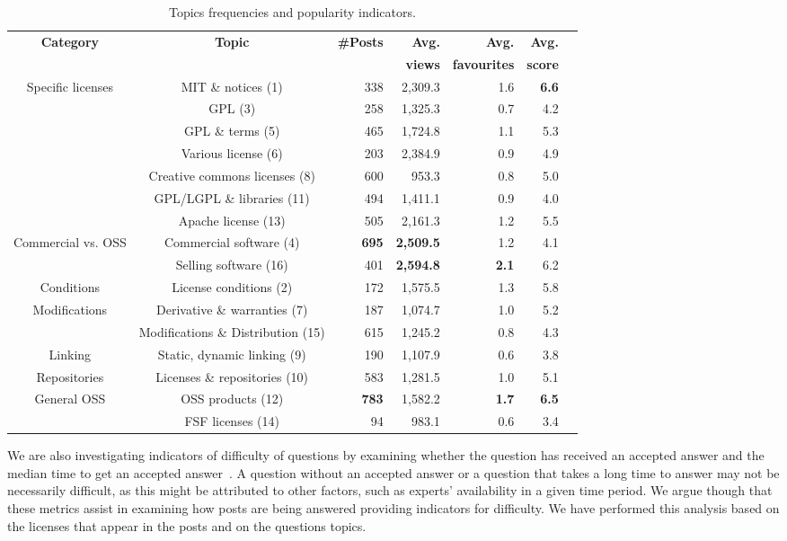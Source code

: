 \documentclass{elsarticle}
\begin{document}
\begin{table}
  \caption{Topics frequencies and popularity indicators.}
  \label{tab:topics-popularity}
  \centering
  \begin{adjustbox}{width=0.99\textwidth}
  \begin{tabular}{ccrrrrr}
    \hline
     \textbf{Category} & \textbf{Topic} & \textbf{\#Posts} & \textbf{Avg.} & \textbf{Avg.} & \textbf{Avg.}\\
     &&&\textbf{views}  &\textbf{favourites} & \textbf{score}\\
     \hline
Specific licenses&	MIT \& notices (1)&	338&	2,309.3&	1.6	&\textbf{6.6}\\
&	GPL (3)	&258&	1,325.3	&0.7&	4.2\\
&	GPL \& terms (5)&	465&	1,724.8&	1.1	&5.3\\
&	Various license (6)&	203&	2,384.9&	0.9&	4.9\\
&	Creative commons licenses (8)&	600&	953.3&	0.8&	5.0\\
&	GPL/LGPL \& libraries (11)	&494&	1,411.1&	0.9	&4.0\\
&	Apache license (13)	&505&	2,161.3&	1.2&	5.5\\
\hline
Commercial vs. OSS &	Commercial software (4)&	\textbf{695}&	\textbf{2,509.5}&	1.2&	4.1\\
&	Selling software (16)&	401&	\textbf{2,594.8}&	\textbf{2.1}&	6.2\\
\hline
Conditions&	License conditions (2)&	172&	1,575.5&	1.3&	5.8\\
\hline
Modifications&	Derivative \& warranties (7)	&187&	1,074.7&	1.0&	5.2\\
&	Modifications \& Distribution (15)&	615	&1,245.2&	0.8	&4.3\\
\hline
Linking&	Static, dynamic linking (9)&	190&	1,107.9&	0.6&	3.8\\
\hline
Repositories&	Licenses \& repositories (10)&	583&	1,281.5&	1.0&	5.1\\
\hline
General OSS&OSS products (12)&	\textbf{783}&	1,582.2&	\textbf{1.7}&	\textbf{6.5}\\
&	FSF licenses (14)&	94	&983.1&	0.6	&3.4\\
     \hline
\end{tabular}
\end{adjustbox}
\end{table}

We are also investigating indicators of difficulty of questions by examining whether the question has received an accepted answer and the median time to get an accepted answer~\cite{abdellatif2020challenges}. A question without an accepted answer or a question that takes a long time to answer may not be necessarily difficult, as this might be attributed to other factors, such as experts' availability in a given time period. We argue though that these metrics assist in examining how posts are being answered providing indicators for difficulty. We have performed this analysis based on the licenses that appear in the posts and on the questions topics.
\end{document}
